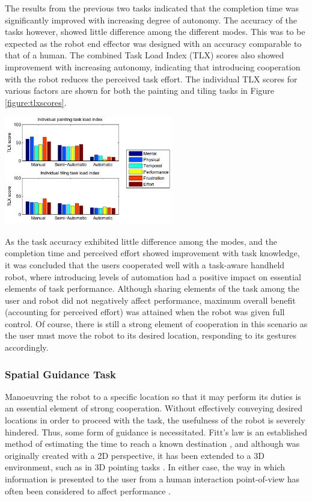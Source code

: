 \documentclass[11pt]{article}
\begin{document}
The results from the previous two tasks indicated that the completion time was significantly improved with increasing degree of autonomy. The accuracy of the tasks however, showed little difference among the different modes. This was to be expected as the robot end effector was designed with an accuracy comparable to that of a human. The combined Task Load Index (TLX) scores also showed improvement with increasing autonomy, indicating that introducing cooperation with the robot reduces the perceived task effort. The individual TLX scores for various factors are shown for both the painting and tiling tasks in Figure \ref{figure:tlxscores}.

\begin{center}
\includegraphics[width = 0.55\textwidth]{tlxscores.png}
\label{figure:tlxscores}
\end{center}

As the task accuracy exhibited little difference among the modes, and the completion time and perceived effort showed improvement with task knowledge, it was concluded that the users cooperated well with a task-aware handheld robot, where introducing levels of automation had a positive impact on essential elements of task performance. Although sharing elements of the task among the user and robot did not negatively affect performance, maximum overall benefit (accounting for perceived effort) was attained when the robot was given full control. Of course, there is still a strong element of cooperation in this scenario as the user must move the robot to its desired location, responding to its gestures accordingly.
	
\subsubsection{Spatial Guidance Task}

Manoeuvring the robot to a specific location so that it may perform its duties is an essential element of strong cooperation. Without effectively conveying desired locations in order to proceed with the task, the usefulness of the robot is severely hindered. Thus, some form of guidance is necessitated. Fitt's law is an established method of estimating the time to reach a known destination \cite{fitts1954}, and although was originally created with a 2D perspective, it has been extended to a 3D environment, such as in 3D pointing tasks \cite{Cha2013}. In either case, the way in which information is presented to the user from a human interaction point-of-view has often been considered to affect performance \cite{soukoreff2004} \cite{MOTOYUKI1995}. 
  
\end{document}
